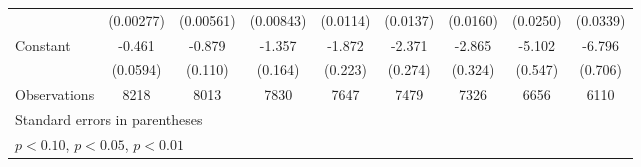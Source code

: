 \begin{table}[htbp]
\begin{tabular}{l*{8}{c}}
                    &   (0.00277)         &   (0.00561)         &   (0.00843)         &    (0.0114)         &    (0.0137)         &    (0.0160)         &    (0.0250)         &    (0.0339)         \\
[1em]
Constant            &      -0.461\sym{***}&      -0.879\sym{***}&      -1.357\sym{***}&      -1.872\sym{***}&      -2.371\sym{***}&      -2.865\sym{***}&      -5.102\sym{***}&      -6.796\sym{***}\\
                    &    (0.0594)         &     (0.110)         &     (0.164)         &     (0.223)         &     (0.274)         &     (0.324)         &     (0.547)         &     (0.706)         \\
\hline
Observations        &        8218         &        8013         &        7830         &        7647         &        7479         &        7326         &        6656         &        6110         \\
\hline\hline
\multicolumn{9}{l}{\footnotesize Standard errors in parentheses}\\
\multicolumn{9}{l}{\footnotesize \sym{*} \(p<0.10\), \sym{**} \(p<0.05\), \sym{***} \(p<0.01\)}\\
\end{tabular}
\end{table}
